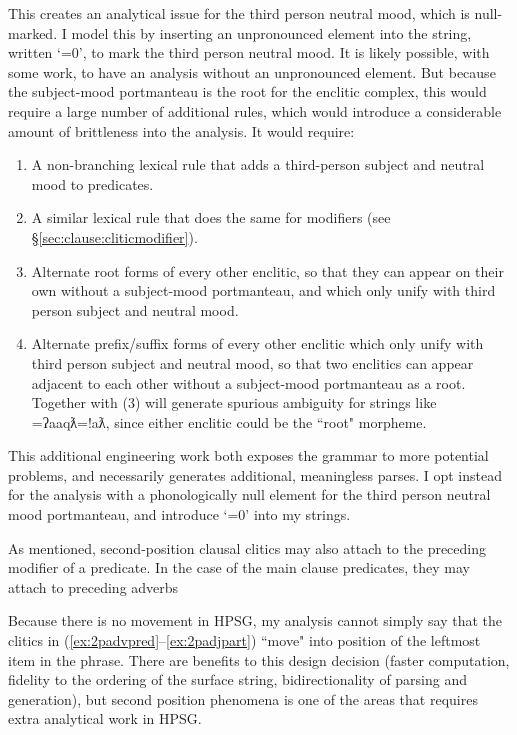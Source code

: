 This creates an analytical issue for the third person neutral mood, which is null-marked. I model this by inserting an unpronounced element into the string, written `=0', to mark the third person neutral mood. It is likely possible, with some work, to have an analysis without an unpronounced element. But because the subject-mood portmanteau is the root for the enclitic complex, this would require a large number of additional rules, which would introduce a considerable amount of brittleness into the analysis. It would require:

\begin{enumerate}
	\item A non-branching lexical rule that adds a third-person subject and neutral mood to predicates.
	\item A similar lexical rule that does the same for modifiers (see \S\ref{sec:clause:cliticmodifier}).
	\item Alternate root forms of every other enclitic, so that they can appear on their own without a subject-mood portmanteau, and which only unify with third person subject and neutral mood.
	\item Alternate prefix/suffix forms of every other enclitic which only unify with third person subject and neutral mood, so that two enclitics can appear adjacent to each other without a subject-mood portmanteau as a root. Together with (3) will generate spurious ambiguity for strings like =ʔaaqƛ=!aƛ, since either enclitic could be the ``root" morpheme.
\end{enumerate}

This additional engineering work both exposes the grammar to more potential problems, and necessarily generates additional, meaningless parses. I opt instead for the analysis with a phonologically null element for the third person neutral mood portmanteau, and introduce `=0' into my strings.

As mentioned, second-position clausal clitics may also attach to the preceding modifier of a predicate. In the case of the main clause predicates, they may attach to preceding adverbs 

Because there is no movement in HPSG, my analysis cannot simply say that the clitics in (\ref{ex:2padvpred}--\ref{ex:2padjpart}) ``move" into position of the leftmost item in the phrase. There are benefits to this design decision (faster computation, fidelity to the ordering of the surface string, bidirectionality of parsing and generation), but second position phenomena is one of the areas that requires extra analytical work in HPSG.

